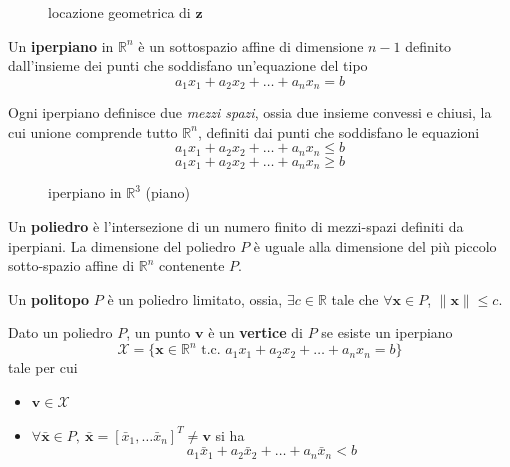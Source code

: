\documentclass[10pt, letterpaper]{report}
\begin{document}
\begin{figure}[h]\label{fig:segmento}
    \caption{locazione geometrica di $\mathbf z$}
\end{figure}
\begin{definizione}
    Un \textbf{iperpiano} in $\mathbb R^n$ è un sottospazio affine di dimensione $n-1$ definito dall'insieme dei punti che soddisfano un'equazione del tipo 
    $$ a_1 x_1+a_2 x_2+\dots +a_n x_n= b$$
\end{definizione}
Ogni iperpiano definisce due \textit{mezzi spazi}, ossia due insieme convessi e chiusi, la cui unione comprende tutto $\mathbb R^n$, definiti dai punti che soddisfano le equazioni 
$$ a_1 x_1+a_2 x_2+\dots +a_n x_n\le b$$
$$ a_1 x_1+a_2 x_2+\dots +a_n x_n\ge b$$
\begin{figure}[h!]
    \centering
    \caption{iperpiano in $\mathbb R^3$ (piano)}
\end{figure}
\begin{definizione}
    Un \textbf{poliedro} è l'intersezione di un numero finito di mezzi-spazi definiti da iperpiani. La dimensione del poliedro $P$ è uguale alla dimensione del più piccolo sotto-spazio affine di $\mathbb R^n$ contenente $P$. 
\end{definizione}
\begin{definizione}
    Un \textbf{politopo} $P$ è un poliedro limitato, ossia, $\exists c\in \mathbb R$ tale che  $\forall \mathbf x \in P$,  $\|\mathbf x\|\le c$.
\end{definizione}
\begin{definizione}
    Dato un poliedro $P$, un punto $\mathbf v$ è un \textbf{vertice} di $P$ se esiste un iperpiano $$\mathcal X = \{\mathbf x \in \mathbb R^n\text{ t.c. }a_1 x_1+a_2 x_2+\dots +a_n x_n= b\}$$ tale per cui\begin{itemize}\item $\mathbf v\in\mathcal X$\item $\forall \bar{\mathbf x} \in P, \ \bar{\mathbf x}=[\bar x_1,\dots \bar x_n]^T \ne \mathbf v$ si ha 
    $$ a_1 \bar x_1+a_2\bar x_2+\dots +a_n\bar x_n<  b$$\end{itemize}
\end{definizione}
\end{document}

